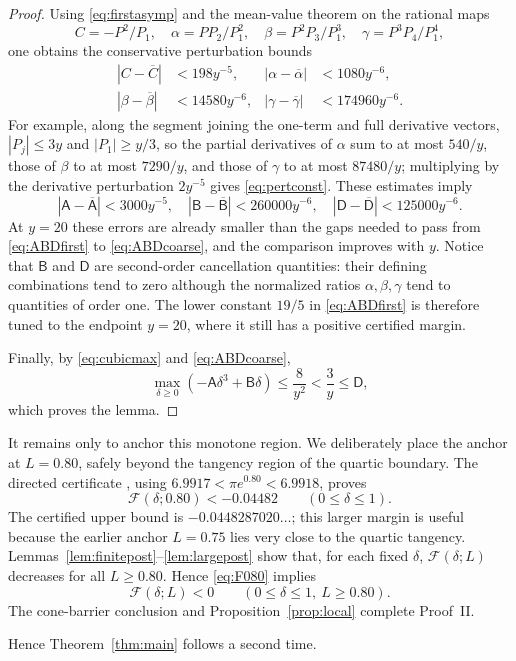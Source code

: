 \documentclass{amsart}
\numberwithin{equation}{section}
\theoremstyle{definition}
\theoremstyle{remark}
\newcommand{\Fcal}{\mathcal F}
\begin{document}
\begin{proof}
Using \eqref{eq:firstasymp} and the mean-value theorem on the rational maps
\[
 C=-P^2/P_1,\quad
 \alpha=PP_2/P_1^2,\quad
 \beta=P^2P_3/P_1^3,\quad
 \gamma=P^3P_4/P_1^4,
\]
one obtains the conservative perturbation bounds
\begin{align}\label{eq:pertconst}
 |C-\overline C|&<198y^{-5},&
 |\alpha-\overline\alpha|&<1080y^{-6},\\
 |\beta-\overline\beta|&<14580y^{-6},&
 |\gamma-\overline\gamma|&<174960y^{-6}.
\end{align}
For example, along the segment joining the one-term and full derivative vectors, $|P_j|\le3y$ and $|P_1|\ge y/3$, so the partial derivatives of $\alpha$ sum to at most $540/y$, those of $\beta$ to at most $7290/y$, and those of $\gamma$ to at most $87480/y$; multiplying by the derivative perturbation $2y^{-5}$ gives \eqref{eq:pertconst}.  These estimates imply
\[
 |\mathsf A-\overline{\mathsf A}|<3000y^{-5},\quad
 |\mathsf B-\overline{\mathsf B}|<260000y^{-6},\quad
 |\mathsf D-\overline{\mathsf D}|<125000y^{-6}.
\]
At $y=20$ these errors are already smaller than the gaps needed to pass from \eqref{eq:ABDfirst} to \eqref{eq:ABDcoarse}, and the comparison improves with $y$.  Notice that $\mathsf B$ and $\mathsf D$ are second-order cancellation quantities: their defining combinations tend to zero although the normalized ratios $\alpha,\beta,\gamma$ tend to quantities of order one.  The lower constant $19/5$ in \eqref{eq:ABDfirst} is therefore tuned to the endpoint $y=20$, where it still has a positive certified margin.

Finally, by \eqref{eq:cubicmax} and \eqref{eq:ABDcoarse},
\[
 \max_{\delta\ge0}(-\mathsf A\delta^3+\mathsf B\delta)
 \le\frac8{y^2}<\frac3y\le\mathsf D,
\]
which proves the lemma.
\end{proof}

It remains only to anchor this monotone region.  We deliberately place the anchor at $L=0.80$, safely beyond the tangency region of the quartic boundary.  The directed certificate
, using
$6.9917<\pi e^{0.80}<6.9918$, proves
\begin{equation}\label{eq:F080}
 \boxed{\qquad \Fcal(\delta;0.80)<-0.04482
 \qquad(0\le\delta\le1).\qquad}
\end{equation}
The certified upper bound is $-0.0448287020\ldots$; this larger margin is useful because the earlier anchor $L=0.75$ lies very close to the quartic tangency.  Lemmas~\ref{lem:finitepost}--\ref{lem:largepost} show that, for each fixed $\delta$, $\Fcal(\delta;L)$ decreases for all $L\ge0.80$.  Hence \eqref{eq:F080} implies
\begin{equation}\label{eq:Fallpost}
 \Fcal(\delta;L)<0\qquad(0\le\delta\le1,\ L\ge0.80).
\end{equation}
The cone-barrier conclusion and Proposition~\ref{prop:local} complete Proof~II.\par Hence Theorem~\ref{thm:main} follows a second time.
\end{document}
